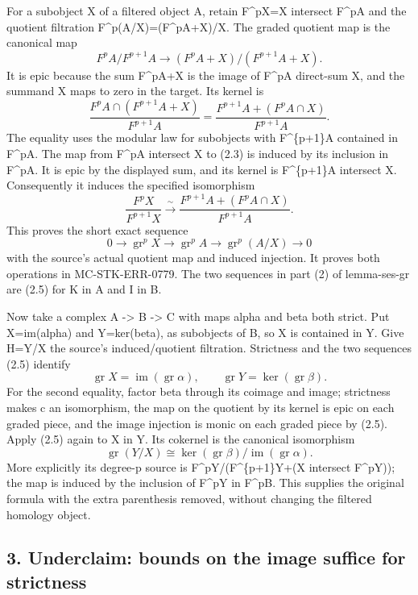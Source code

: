 \documentclass[11pt]{article}
\begin{document}
For a subobject X of a filtered object A, retain F\^{}pX=X intersect F\^{}pA and the quotient filtration F\^{}p(A/X)=(F\^{}pA+X)/X. The graded quotient map is the canonical map \[
F^pA/F^{p+1}A
\longrightarrow
(F^pA+X)/(F^{p+1}A+X).                                    \tag{2.2}
\] It is epic because the sum F\^{}pA+X is the image of F\^{}pA direct-sum X, and the summand X maps to zero in the target. Its kernel is \[
\frac{F^pA\cap(F^{p+1}A+X)}{F^{p+1}A}
=\frac{F^{p+1}A+(F^pA\cap X)}{F^{p+1}A}.                  \tag{2.3}
\] The equality uses the modular law for subobjects with F\^{}\{p+1\}A contained in F\^{}pA. The map from F\^{}pA intersect X to (2.3) is induced by its inclusion in F\^{}pA. It is epic by the displayed sum, and its kernel is F\^{}\{p+1\}A intersect X. Consequently it induces the specified isomorphism \[
\frac{F^pX}{F^{p+1}X}
\xrightarrow{\ \sim\ }
\frac{F^{p+1}A+(F^pA\cap X)}{F^{p+1}A}.                    \tag{2.4}
\] This proves the short exact sequence \[
0\longrightarrow\operatorname{gr}^pX
\longrightarrow\operatorname{gr}^pA
\longrightarrow\operatorname{gr}^p(A/X)\longrightarrow0
                                                               \tag{2.5}
\] with the source's actual quotient map and induced injection. It proves both operations in MC-STK-ERR-0779. The two sequences in part (2) of lemma-ses-gr are (2.5) for K in A and I in B.

Now take a complex A -\textgreater{} B -\textgreater{} C with maps alpha and beta both strict. Put X=im(alpha) and Y=ker(beta), as subobjects of B, so X is contained in Y. Give H=Y/X the source's induced/quotient filtration. Strictness and the two sequences (2.5) identify \[
\operatorname{gr}X=\operatorname{im}(\operatorname{gr}\alpha),
\qquad
\operatorname{gr}Y=\ker(\operatorname{gr}\beta).
\] For the second equality, factor beta through its coimage and image; strictness makes c an isomorphism, the map on the quotient by its kernel is epic on each graded piece, and the image injection is monic on each graded piece by (2.5). Apply (2.5) again to X in Y. Its cokernel is the canonical isomorphism \[
\operatorname{gr}(Y/X)
\cong
\ker(\operatorname{gr}\beta)/
\operatorname{im}(\operatorname{gr}\alpha).                \tag{2.6}
\] More explicitly its degree-p source is F\^{}pY/(F\^{}\{p+1\}Y+(X intersect F\^{}pY)); the map is induced by the inclusion of F\^{}pY in F\^{}pB. This supplies the original formula with the extra parenthesis removed, without changing the filtered homology object.

\subsection{3. Underclaim: bounds on the image suffice for strictness}\label{note-05-underclaim-bounds-on-the-image-suffice-for-strictness}
\end{document}
